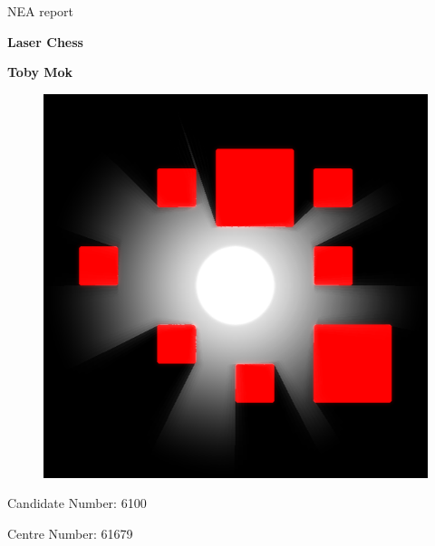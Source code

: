 \documentclass{report}
\begin{document}
\pagestyle{fancy}


\fancyfoot[L]{\leftmark}
\fancyfoot[C]{\thepage}
\fancyfoot[R]{\rightmark}

\begin{titlepage}
\begin{center}
\vspace*{1cm}

\LARGE
NEA report

\vspace*{0.5cm}
{\fontsize{40}{50}\selectfont \textbf{Laser Chess}}

\vspace*{1cm}

\Large
\textbf{Toby Mok}

\vspace*{1.5cm}

\begin{figure}[H]
    \centering
    \includegraphics[width=0.5\columnwidth]{../main/assets/thumbnail.png}
\end{figure}

\vfill

\normalsize

Candidate Number: 6100

Centre Number: 61679

\end{center}
\end{titlepage}

\newpage
\tableofcontents










\appendix


\end{document}
